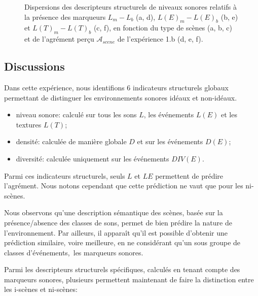\begin{figure}[t]
       \caption{Dispersions des descripteurs structurels de niveaux sonores relatifs à la présence des marqueurs $L_m-L_b$ (a, d), $L(E)_m-L(E)_b$ (b, e) et $L(T)_m-L(T)_b$ (c, f), en fonction du type de scènes (a, b, c) et de l'agrément perçu $\mathcal{A}_{scene}$ de l'expérience 1.b (d, e, f).}\label{fig:soundlevelMarkerDiff}
\end{figure}

\subsection{Discussions}

Dans cette expérience, nous identifions 6 indicateurs structurels globaux permettant de distinguer les environnements sonores idéaux et non-idéaux.

\begin{itemize}
\item niveau sonore: calculé sur tous les sons $L$, les événements $L(E)$ et les textures $L(T)$; 
\item densité: calculée de manière globale $D$ et sur les événements $D(E)$;
\item diversité: calculée uniquement sur les événements $DIV(E)$.
\end{itemize}

Parmi ces indicateurs structurels, seuls $L$ et $LE$ permettent de prédire l'agrément. Nous notons cependant que cette prédiction ne vaut que pour les ni-scènes. 

Nous observons qu'une description sémantique des scènes, basée sur la présence/absence des classes de sons, permet de bien prédire la nature de l'environnement. Par ailleurs, il apparaît qu'il est possible d'obtenir une prédiction similaire, voire meilleure, en ne considérant qu'un sous groupe de classes d'événements,\ie~les marqueurs sonores.

Parmi les descripteurs structurels spécifiques, calculés en tenant compte des marqueurs sonores, plusieurs permettent maintenant de faire la distinction entre les i-scènes et ni-scènes:

